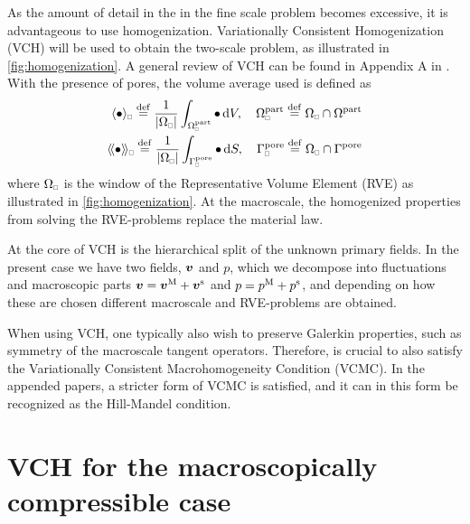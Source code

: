 \documentclass[MikaelDissertation.tex]{subfiles}
\begin{document}
As the amount of detail in the in the fine scale problem becomes excessive, it is advantageous to use homogenization.
Variationally Consistent Homogenization (VCH) will be used to obtain the two-scale problem, as illustrated in \cref{fig:homogenization}.
A general review of VCH can be found in Appendix A in .
With the presence of pores, the volume average used is defined as
\begin{align}
 \homgen{\bullet} \defeq \frac{1}{\volume} \int_{\Omega_\rve^\particle} \bullet \dif V,\quad \Omega_\rve^\particle \defeq \Omega_\rve \cap \Omega^\particle
\\
 \shomgen{\bullet} \defeq \frac{1}{\volume} \int_{\Gamma^\pore_\rve} \bullet \dif S,\quad \Gamma^\pore_\rve \defeq \Omega_\rve \cap \Gamma^\pore
\end{align}
where $\Omega_\rve$ is the window of the Representative Volume Element (RVE) as illustrated in \cref{fig:homogenization}.
At the macroscale, the homogenized properties from solving the RVE-problems replace the material law.

At the core of VCH is the hierarchical split of the unknown primary fields.
In the present case we have two fields, $\boldsymbol{v}$ and $p$, which we decompose into fluctuations and macroscopic parts $\boldsymbol{v} = \boldsymbol{v}^{\mathrm{M}} + \boldsymbol{v}^{\mathrm{s}}$ and $p = p^{\mathrm{M}} + p^{\mathrm{s}}$, and depending on how these are chosen different macroscale and RVE-problems are obtained.

When using VCH, one typically also wish to preserve Galerkin properties, such as symmetry of the macroscale tangent operators. Therefore, is crucial to also satisfy the Variationally Consistent Macrohomogeneity Condition (VCMC).
In the appended papers, a stricter form of VCMC is satisfied, and it can in this form be recognized as the Hill-Mandel condition.


\section{VCH for the macroscopically compressible case}
\end{document}
